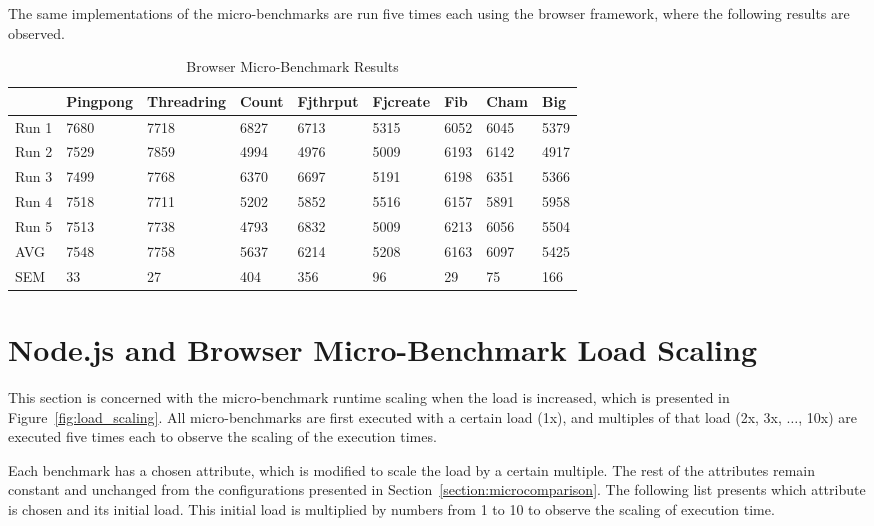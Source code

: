 \documentclass[oneside]{um-fict}
\begin{document}
The same implementations of the micro-benchmarks are run five times each using the browser framework, where the following results are observed.
\begin{table}[H]
    \begin{center}
        \begin{tabular}{|l|llllllll|}
        \hline
            & Pingpong & Threadring & Count  & Fjthrput & Fjcreate & Fib    & Cham & Big    \\ \hline
        Run 1 & 7680     & 7718       & 6827   & 6713     & 5315     & 6052   & 6045      & 5379   \\
        Run 2 & 7529     & 7859       & 4994   & 4976     & 5009     & 6193   & 6142      & 4917   \\
        Run 3 & 7499     & 7768       & 6370   & 6697     & 5191     & 6198   & 6351      & 5366   \\
        Run 4 & 7518     & 7711       & 5202   & 5852     & 5516     & 6157   & 5891      & 5958   \\
        Run 5 & 7513     & 7738       & 4793   & 6832     & 5009     & 6213   & 6056      & 5504   \\ \hline
        AVG   & 7548   & 7758     & 5637 & 6214     & 5208     & 6163 & 6097      & 5425 \\
        SEM   & 33     & 27       & 404 & 356   & 96    & 29  & 75     & 166 \\ \hline
        \end{tabular}
        \caption{Browser Micro-Benchmark Results}\label{tab:browsermicro}
    \end{center}
\end{table}
\section{Node.js and Browser Micro-Benchmark Load Scaling}
This section is concerned with the micro-benchmark runtime scaling when the load is increased, which is presented in Figure~\ref{fig:load_scaling}. All micro-benchmarks are first executed with a certain load (1x), and multiples of that load (2x, 3x, $\ldots$, 10x) are executed five times each to observe the scaling of the execution times.

Each benchmark has a chosen attribute, which is modified to scale the load by a certain multiple. The rest of the attributes remain constant and unchanged from the configurations presented in Section~\ref{section:microcomparison}. The following list presents which attribute is chosen and its initial load. This initial load is multiplied by numbers from 1 to 10 to observe the scaling of execution time.
\end{document}
